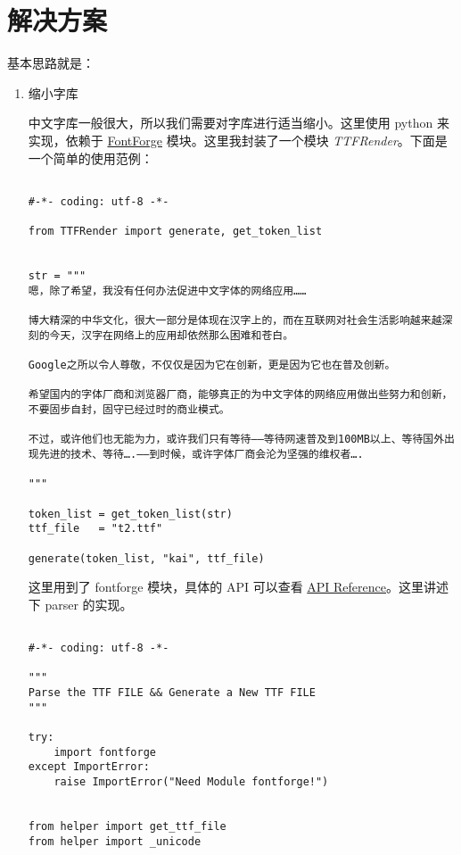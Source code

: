 \documentclass[a4paper,12pt]{report}
\begin{document}
\chapter{解决方案}

基本思路就是：

\begin{enumerate}

\item 缩小字库

中文字库一般很大，所以我们需要对字库进行适当缩小。这里使用 python 来实现，依赖于 \href{http://fontforge.sourceforge.net/}{FontForge} 模块。这里我封装了一个模块 \emph{TTFRender}。下面是一个简单的使用范例：

\begin{verbatim}

#-*- coding: utf-8 -*-

from TTFRender import generate, get_token_list


str = """
嗯，除了希望，我没有任何办法促进中文字体的网络应用……

博大精深的中华文化，很大一部分是体现在汉字上的，而在互联网对社会生活影响越来越深刻的今天，汉字在网络上的应用却依然那么困难和苍白。

Google之所以令人尊敬，不仅仅是因为它在创新，更是因为它也在普及创新。

希望国内的字体厂商和浏览器厂商，能够真正的为中文字体的网络应用做出些努力和创新，不要固步自封，固守已经过时的商业模式。

不过，或许他们也无能为力，或许我们只有等待——等待网速普及到100MB以上、等待国外出现先进的技术、等待….——到时候，或许字体厂商会沦为坚强的维权者….

"""

token_list = get_token_list(str)
ttf_file   = "t2.ttf"

generate(token_list, "kai", ttf_file)

\end{verbatim}

这里用到了 fontforge 模块，具体的 API 可以查看 \href{http://fontforge.sourceforge.net/python.html}{API Reference}。这里讲述下 parser 的实现。


\begin{verbatim}

#-*- coding: utf-8 -*-

"""
Parse the TTF FILE && Generate a New TTF FILE
"""

try:
    import fontforge
except ImportError:
    raise ImportError("Need Module fontforge!")


from helper import get_ttf_file
from helper import _unicode


\end{verbatim}
\end{enumerate}
\end{document}
